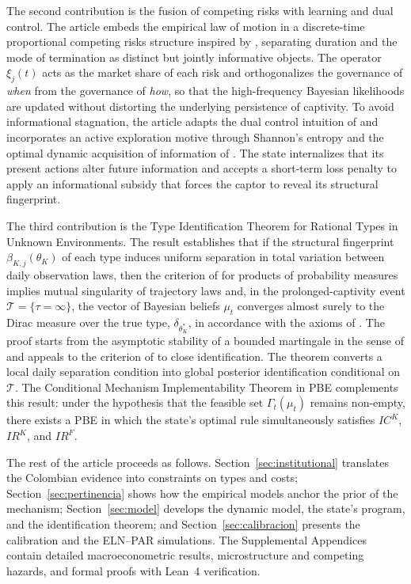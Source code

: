 \documentclass[ecta,nameyear,draft]{econsocart}
\theoremstyle{plain}
\theoremstyle{definition}
\newcommand{\1}{\mathbf{1}}
\newcommand{\Dirac}{\delta}
\begin{document}
The second contribution is the fusion of competing risks with learning and dual control. The article embeds the empirical law of motion in a discrete-time proportional competing risks structure inspired by \citet{Cox1972}, separating duration and the mode of termination as distinct but jointly informative objects. The operator $\xi_j(t)$ acts as the market share of each risk and orthogonalizes the governance of \emph{when} from the governance of \emph{how}, so that the high-frequency Bayesian likelihoods are updated without distorting the underlying persistence of captivity. To avoid informational stagnation, the article adapts the dual control intuition of \citet{Feldbaum1965} and incorporates an active exploration motive through Shannon's entropy \citet{Shannon1948} and the optimal dynamic acquisition of information of \citet{Zhong2022}. The state internalizes that its present actions alter future information and accepts a short-term loss penalty to apply an informational subsidy that forces the captor to reveal its structural fingerprint.

The third contribution is the Type Identification Theorem for Rational Types in Unknown Environments. The result establishes that if the structural fingerprint $\beta_{K,j}(\theta_K)$ of each type induces uniform separation in total variation between daily observation laws, then the criterion of \citet{Kakutani1948} for products of probability measures implies mutual singularity of trajectory laws and, in the prolonged-captivity event $\mathcal{T}=\{\tau=\infty\}$, the vector of Bayesian beliefs $\mu_t$ converges almost surely to the Dirac measure over the true type, $\Dirac_{\theta_K^\ast}$, in accordance with the axioms of \citet{BlackwellDubins1962}. The proof starts from the asymptotic stability of a bounded martingale in the sense of \citet{Doob1953Stochastic} and appeals to the criterion of \citet{Kakutani1948} to close identification. The theorem converts a local daily separation condition into global posterior identification conditional on $\mathcal{T}$. The Conditional Mechanism Implementability Theorem in PBE complements this result: under the hypothesis that the feasible set $\Gamma_t(\mu_t)$ remains non-empty, there exists a PBE in which the state's optimal rule simultaneously satisfies $IC^K$, $IR^K$, and $IR^F$.

The rest of the article proceeds as follows. Section~\ref{sec:institutional} translates the Colombian evidence into constraints on types and costs; Section~\ref{sec:pertinencia} shows how the empirical models anchor the prior of the mechanism; Section~\ref{sec:model} develops the dynamic model, the state's program, and the identification theorem; and Section~\ref{sec:calibracion} presents the calibration and the ELN--PAR simulations. The Supplemental Appendices contain detailed macroeconometric results, microstructure and competing hazards, and formal proofs with Lean~4 verification.
\end{document}
